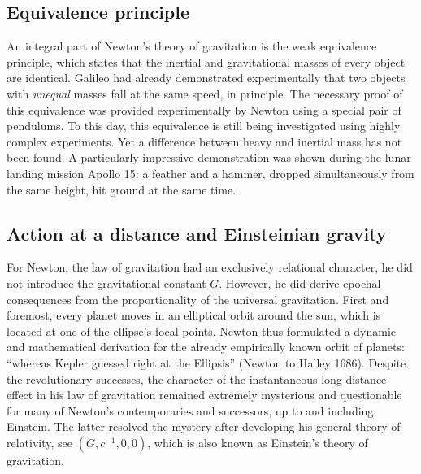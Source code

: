 \documentclass{scrartcl}
\begin{document}
\subsection*{Equivalence principle}

An integral part of Newton's theory of gravitation is the weak equivalence principle, which states that the inertial and gravitational masses of every object are identical. Galileo had already demonstrated experimentally that two objects with \emph{unequal} masses fall at the same speed, in principle. The necessary proof of this equivalence was provided experimentally by Newton using a special pair of pendulums. To this day, this equivalence is still being investigated using highly complex experiments. Yet a difference between heavy and inertial mass has not been found. A particularly impressive demonstration was shown during the lunar landing mission Apollo 15: a feather and a hammer, dropped simultaneously from the same height, hit ground at the same time.


\subsection*{Action at a distance and Einsteinian gravity}

For Newton, the law of gravitation had an exclusively relational character, he did not introduce the gravitational constant $G$. However, he did derive epochal consequences from the proportionality of the universal gravitation. First and foremost, every planet moves in an elliptical orbit around the sun, which is located at one of the ellipse's focal points. Newton thus formulated a dynamic and mathematical derivation for the already empirically known orbit of planets: \enquote{whereas Kepler guessed right at the Ellipsis} (Newton to Halley 1686). Despite the revolutionary successes, the character of the instantaneous long-distance effect in his law of gravitation remained extremely mysterious and questionable for many of Newton's contemporaries and successors, up to and including Einstein. The latter resolved the mystery after developing his general theory of relativity, see $(G,c^{-1},0,0)$, which is also known as Einstein's theory of gravitation.



\newpage {}
\label{sec:1001}
\end{document}
